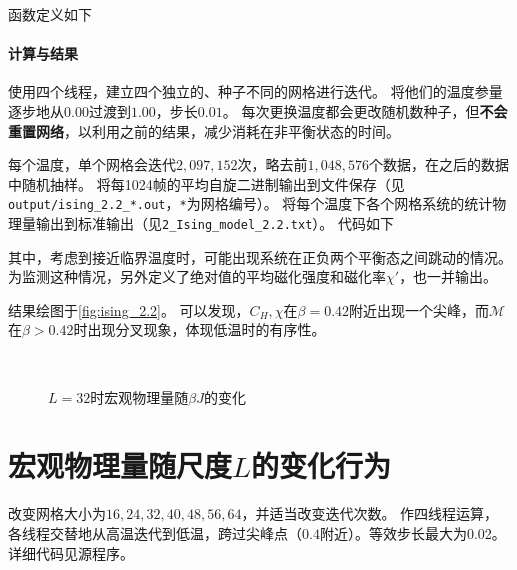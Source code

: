 \documentclass[a4paper,unicode]{report}
\begin{document}
函数定义如下
{
    \linespread{1.0}
    
    
}

\paragraph{计算与结果}

使用四个线程，建立四个独立的、种子不同的网格进行迭代。
将他们的温度参量逐步地从$0.00$过渡到$1.00$，步长$0.01$。
每次更换温度都会更改随机数种子，但\textbf{不会重置网络}，以利用之前的结果，减少消耗在非平衡状态的时间。

每个温度，单个网格会迭代$2,097,152$次，略去前$1,048,576$个数据，在之后的数据中随机抽样。
将每1024帧的平均自旋二进制输出到文件保存（见\texttt{output/ising\_2.2\_*.out}，\texttt{*}为网格编号）。
将每个温度下各个网格系统的统计物理量输出到标准输出（见\texttt{2\_Ising\_model\_2.2.txt}）。
代码如下
{
    \linespread{1.0}
    
}

其中，考虑到接近临界温度时，可能出现系统在正负两个平衡态之间跳动的情况。
为监测这种情况，另外定义了绝对值的平均磁化强度和磁化率$\chi'$，也一并输出。

结果绘图于\autoref{fig:ising_2.2}。
可以发现，$C_H,\chi$在$\beta=0.42$附近出现一个尖峰，而$\mathcal{M}$在$\beta>0.42$时出现分叉现象，体现低温时的有序性。

\begin{figure}
    \centering
    \\
    \caption{$L=32$时宏观物理量随$\beta J$的变化}
    \label{fig:ising_2.2}
\end{figure}

\section{宏观物理量随尺度\texorpdfstring{$L$}{L}的变化行为}

改变网格大小为$16,24,32,40,48,56,64$，并适当改变迭代次数。
作四线程运算，各线程交替地从高温迭代到低温，跨过尖峰点（$0.4$附近）。等效步长最大为0.02。
详细代码见源程序。
\end{document}

